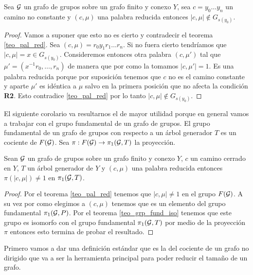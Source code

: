 \documentclass[tesis.tex]{subfiles}
\begin{document}
\begin{coro}\label{coro_pal_red_2}
	Sea ${\cal G}$ un grafo de grupos sobre un grafo finito y conexo $Y$, sea $c = y_0 \dots y_n$ un camino no constante y $(c, \mu)$ una palabra reducida entonces $|c, \mu| \notin G_{s(y_0)}$.
\end{coro}
\begin{proof}
	Vamos a suponer que esto no es cierto y contradecir el teorema \ref{teo_pal_red}.
	Sea $(c, \mu) = r_0y_1r_1\dots r_n$.
	Si no fuera cierto tendríamos que $|c,\mu| = x \in G_{s(y_0)}$. 
	Consideremos entonces otra palabra $(c,\mu')$ tal que $\mu' = (x^{-1}r_0, \dots, r_n)$ de manera que por como la tomamos $|c,\mu'| = 1$.
	Es una palabra reducida porque por suposición tenemos que $c$ no es el camino constante y aparte $\mu'$ es idéntica a $\mu$ salvo en la primera posición que no afecta la condición \textbf{R2}.
	Esto contradice \ref{teo_pal_red} por lo tanto $|c, \mu| \notin G_{s(y_0)}$.
\end{proof}

El siguiente corolario va resultarnos el de mayor utilidad porque en general vamos a trabajar con el grupo fundamental de un grafo de grupos.
El grupo fundamental de un grafo de grupos con respecto a un árbol generador $T$ es un cociente de $F({\cal G})$. 
Sea $\pi: F({\cal G}) \to \pi_1({\cal G},T)$ la proyección.

\begin{coro}\label{coro_pal_red_3}
	Sean ${\cal G}$ un grafo de grupos sobre un grafo finito y conexo $Y$, $c$ un camino cerrado en $Y$, $T$ un árbol generador de $Y$ y $(c, \mu)$ una palabra reducida entonces $\pi(|c,\mu|) \neq 1$ en $\pi_1({\cal G}, T)$. 
\end{coro}
\begin{proof}
	Por el teorema \ref{teo_pal_red} tenemos que $|c,\mu| \neq 1$ en el grupo $F({\cal G})$.
	A su vez por como elegimos a $(c, \mu)$ tenemos que es un elemento del grupo fundamental $\pi_1({\cal G}, P)$.
	Por el teorema \ref{teo_grp_fund_iso} tenemos que este grupo es isomorfo con el grupo fundamental $\pi_1({\cal G}, T)$ por medio de la proyección $\pi$ entonces esto termina de probar el resultado.
\end{proof}





Primero vamos a dar una definición estándar que es la del cociente de un grafo no dirigido que va a ser la herramienta principal para poder reducir el tamaño de un grafo.
\end{document}
